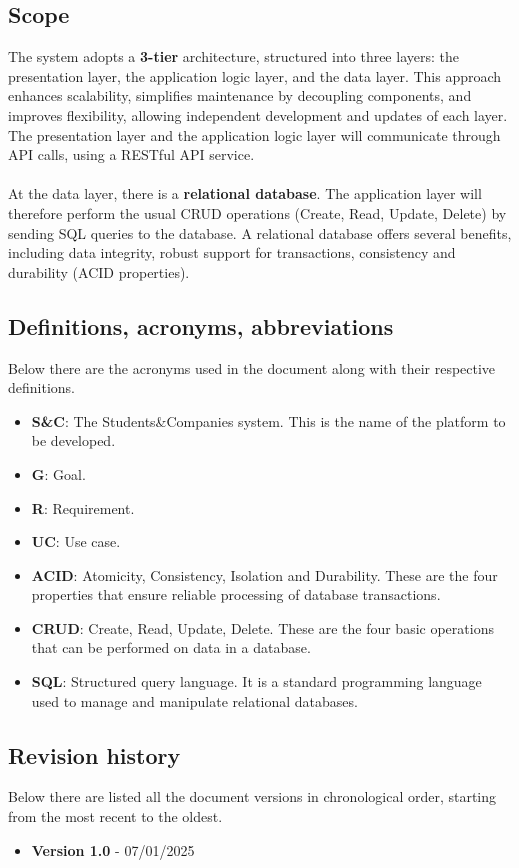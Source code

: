 \subsection{Scope}
The system adopts a \textbf{3-tier} architecture, structured into three layers: the presentation layer, the application logic layer, and the data layer. This approach enhances scalability, simplifies maintenance by decoupling components, and improves flexibility, allowing independent development and updates of each layer. The presentation layer and the application logic layer will communicate through API calls, using a RESTful API service.\\\\
At the data layer, there is a \textbf{relational database}. The application layer will therefore perform the usual CRUD operations (Create, Read, Update, Delete) by sending SQL queries to the database. A relational database offers several benefits, including data integrity, robust support for transactions, consistency and durability (ACID properties).
\subsection{Definitions, acronyms, abbreviations}
Below there are the acronyms used in the document along with their respective definitions.
\begin{itemize}
    \item \textbf{S\&C}: The Students\&Companies system. This is the name of the platform to be developed.
    \item \textbf{G}: Goal. 
    \item \textbf{R}: Requirement.
    \item \textbf{UC}: Use case.
    \item \textbf{ACID}: Atomicity, Consistency, Isolation and Durability. These are the four properties that ensure reliable processing of database transactions.
    \item \textbf{CRUD}: Create, Read, Update, Delete. These are the four basic operations that can be performed on data in a database.
    \item \textbf{SQL}: Structured query language. It is a standard programming language used to manage and manipulate relational databases.
\end{itemize}
\subsection{Revision history}
Below there are listed all the document versions in chronological order, starting from the most recent to the oldest.
\begin{itemize}
    \item \textbf{Version 1.0} - 07/01/2025
\end{itemize}
